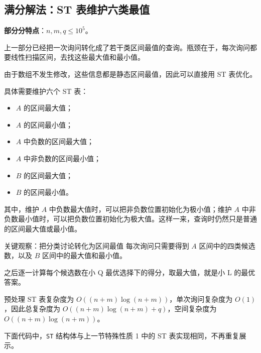 \documentclass{book}
\newcommand{\code}[1]{\colorbox{codebg}{\texttt{#1}}}  %
\begin{document}
\subsection{满分解法：ST 表维护六类最值}

\textbf{部分分特点}：$n,m,q\le 10^5$。

上一部分已经把一次询问转化成了若干类区间最值的查询。瓶颈在于，每次询问都要线性扫描区间，去找这些最大值和最小值。

由于数组不发生修改，这些信息都是静态区间最值，因此可以直接用 ST 表优化。

具体需要维护六个 ST 表：

\begin{itemize}[leftmargin=2em,itemsep=1pt,topsep=2pt,parsep=0pt,partopsep=0pt]
    \item $A$ 的区间最大值；
    \item $A$ 的区间最小值；
    \item $A$ 中负数的区间最大值；
    \item $A$ 中非负数的区间最小值；
    \item $B$ 的区间最大值；
    \item $B$ 的区间最小值。
\end{itemize}

其中，维护 $A$ 中负数最大值时，可以把非负数位置初始化为极小值；维护 $A$ 中非负数最小值时，可以把负数位置初始化为极大值。这样一来，查询时仍然只是普通的区间最大值或最小值。

\begin{keybox}{关键观察：把分类讨论转化为区间最值}
每次询问只需要得到 $A$ 区间中的四类候选数，以及 $B$ 区间中的最大值和最小值。

之后逐一计算每个候选数在小 Q 最优选择下的得分，取最大值，就是小 L 的最优答案。
\end{keybox}

预处理 ST 表复杂度为 $O((n+m)\log(n+m))$，单次询问复杂度为 $O(1)$，因此总复杂度为 $O((n+m)\log(n+m)+q)$，空间复杂度为 $O((n+m)\log(n+m))$。

下面代码中，\code{ST} 结构体与上一节特殊性质 1 中的 ST 表实现相同，不再重复展示。
\end{document}
